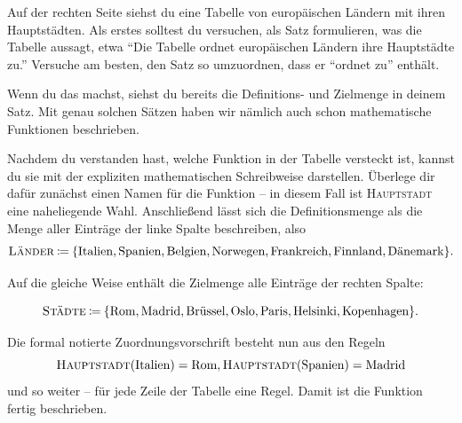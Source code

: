 \documentclass[../../main.tex]{subfiles}
\begin{document}
\begin{example}{}
    
    Auf der rechten Seite siehst du eine Tabelle von europäischen Ländern mit ihren Hauptstädten. Als erstes solltest du versuchen, als Satz formulieren, was die Tabelle aussagt, etwa \enquote{Die Tabelle ordnet europäischen Ländern ihre Hauptstädte zu.} Versuche am besten, den Satz so umzuordnen, dass er \enquote{ordnet zu} enthält.
    
    Wenn du das machst, siehst du bereits die Definitions- und Zielmenge in deinem Satz. Mit genau solchen Sätzen haben wir nämlich auch schon mathematische Funktionen beschrieben.
    
    Nachdem du verstanden hast, welche Funktion in der Tabelle versteckt ist, kannst du sie mit der expliziten mathematischen Schreibweise darstellen. Überlege dir dafür zunächst einen Namen für die Funktion -- in diesem Fall ist \textsc{Hauptstadt} eine naheliegende Wahl. Anschließend lässt sich die Definitionsmenge als die Menge aller Einträge der linke Spalte beschreiben, also
    \[\textsc{Länder}\mathbin{\coloneqq}\{\text{Italien},\text{Spanien},\text{Belgien},\text{Norwegen},\text{Frankreich},\text{Finnland},\text{Dänemark}\}.\]
    
    Auf die gleiche Weise enthält die Zielmenge alle Einträge der rechten Spalte:
    
    \[\textsc{Städte}\mathbin{\coloneqq}\{\text{Rom},\text{Madrid},\text{Brüssel},\text{Oslo},\text{Paris},\text{Helsinki},\text{Kopenhagen}\}.\]
    
    \sloppy
    Die formal notierte Zuordnungsvorschrift besteht nun aus den Regeln \[\textsc{Hauptstadt}(\text{Italien})=\text{Rom}, \textsc{Hauptstadt}(\text{Spanien})=\text{Madrid}\] und so weiter -- für jede Zeile der Tabelle eine Regel. Damit ist die Funktion fertig beschrieben.
    \fussy
\end{example}
\end{document}

